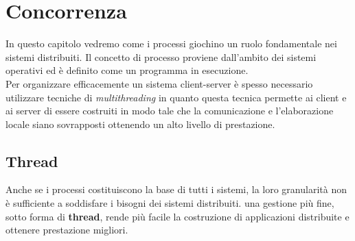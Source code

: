 \section{Concorrenza}\label{capitolo1}
In questo capitolo vedremo come i processi giochino un ruolo fondamentale nei sistemi distribuiti. Il concetto di processo proviene dall'ambito dei sistemi operativi ed è definito come un programma in esecuzione.\\
Per organizzare efficacemente un sistema client-server è spesso necessario utilizzare tecniche di \emph{multithreading} in quanto questa tecnica permette ai client e ai server di essere costruiti in modo tale che la comunicazione e l'elaborazione locale siano sovrapposti ottenendo un alto livello di prestazione.
\subsection{Thread}
Anche se i processi costituiscono la base di tutti i sistemi, la loro granularità non è sufficiente a soddisfare i bisogni dei sistemi distribuiti. una gestione più fine, sotto forma di \textbf{thread}, rende più facile la costruzione di applicazioni distribuite e ottenere prestazione migliori.
